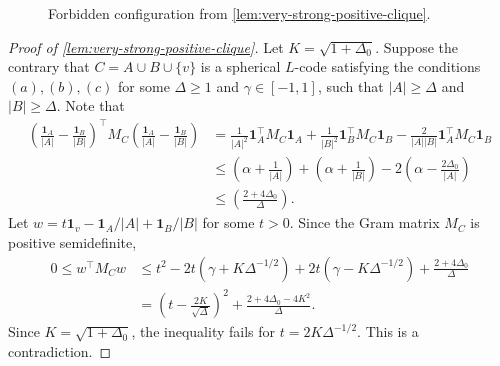 \documentclass[reqno, 11pt]{amsart}
\theoremstyle{definition}
\theoremstyle{remark}
\begin{document}
\begin{figure}[h]
\caption{Forbidden configuration from \cref{lem:very-strong-positive-clique}.}
\end{figure}

\begin{proof}[Proof of \cref{lem:very-strong-positive-clique}]
Let $K = \sqrt{1 + \Delta_0}$. Suppose the contrary that $C = A \cup B \cup \{v\}$ is a spherical $L$-code satisfying the conditions $(a), (b), (c)$ for some $\Delta \geq 1$ and $\gamma \in [-1,1]$, such that $|A| \geq \Delta $ and $|B| \geq \Delta$. Note that
\begin{align*}
	\left(\frac{\mathbf{1}_A}{|A|} - \frac{\mathbf{1}_B}{|B|}\right)^\intercal M_C \left(\frac{\mathbf{1}_A}{|A|} - \frac{\mathbf{1}_B}{|B|}\right) &= \frac{1}{|A|^2}\mathbf{1}_A^\intercal M_C \mathbf{1}_A + \frac{1}{|B|^2}\mathbf{1}_B^\intercal M_C \mathbf{1}_B - \frac{2}{|A||B|}\mathbf{1}_A^\intercal M_C \mathbf{1}_B  \\
	&\leq \left(\alpha + \frac{1}{|A|}\right) + \left(\alpha + \frac{1}{|B|}\right) - 2\left(\alpha - \frac{2\Delta_0}{|A|}\right) \\
        &\leq \left(\frac{2 + 4\Delta_0 }{\Delta}\right).
\end{align*}
Let $w = t\mathbf{1}_v - \mathbf{1}_A/|A| + \mathbf{1}_B/|B|$ for some $t>0$. Since the Gram matrix $M_C$ is positive semidefinite,
\begin{align*}
	0 \leq w^\intercal M_Cw &\leq t^2  - 2t\left(\gamma + K\Delta^{-1/2}\right) + 2t\left(\gamma -K \Delta^{-1/2}\right) + \frac{2 + 4\Delta_0 }{\Delta} \\
 &= \left(t - \frac{2K}{\sqrt{\Delta}}\right)^2 + \frac{2 + 4\Delta_0 - 4K^2}{\Delta}.
\end{align*}
Since $K = \sqrt{1 + \Delta_0}$, the inequality fails for $t = 2K\Delta^{-1/2}$. This is a contradiction.
\end{proof}
\end{document}
